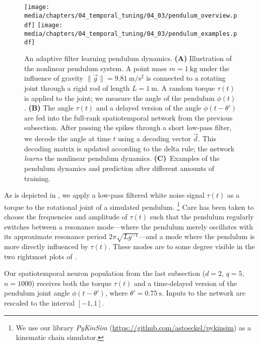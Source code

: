 \begin{figure}
	\centering
	\texttt{[image: media/chapters/04\_temporal\_tuning/04\_03/pendulum\_overview.pdf]}
	\texttt{[image: media/chapters/04\_temporal\_tuning/04\_03/pendulum\_examples.pdf]}%
	{\label{fig:pendulum_overview_a}}%
	{\label{fig:pendulum_overview_b}}%
	{\label{fig:pendulum_overview_c}}%
	\caption[An adaptive filter learning pendulum dynamics]{
		An adaptive filter learning pendulum dynamics.
		\textbf{(A)} Illustration of the nonlinear pendulum system.
		A point mass $m = \SI{1}{\kilogram}$ under the influence of gravity $\| \vec g \| = \SI{9.81}{\metre\per\square\second}$ is connected to a rotating joint through a rigid rod of length $L = \SI{1}{\metre}$.
		A random torque $\tau(t)$ is applied to the joint; we measure the angle of the pendulum $\phi(t)$.
		\textbf{(B)} The angle $\tau(t)$ and a delayed version of the angle $\phi(t - \theta')$ are fed into the full-rank spatiotemporal \NEF network from the previous subsection.
		After passing the spikes through a short low-pass filter, we decode the angle at time $t$ using a decoding vector $\vec d$.
		This decoding matrix is updated according to the delta rule; the network \emph{learns} the nonlinear pendulum dynamics.
		\textbf{(C)}~Examples of the pendulum dynamics and prediction after different amounts of training.
	}
	\label{fig:pendulum_overview}
\end{figure}
As is depicted in , we apply a low-pass filtered white noise signal $\tau(t)$ as a torque to the rotational joint of a simulated pendulum.%
\footnote{We use our library \emph{PyKinSim} (\url{https://github.com/astoeckel/pykinsim}) as a kinematic chain simulator.}
Care has been taken to choose the frequencies and amplitude of $\tau(t)$ such that the pendulum regularly switches between a resonance mode---where the pendulum merely oscillates with its approximate resonance period $2 \pi \sqrt{L g^{-1}}$---and a mode where the pendulum is more directly influenced by $\tau(t)$.
These modes are to some degree visible in the two rightmost plots of .

Our spatiotemporal neuron population from the last subsection ($d = 2$, $q = 5$, $n = 1000$) receives both the torque $\tau(t)$ and a time-delayed version of the pendulum joint angle $\phi(t - \theta')$, where $\theta' = \SI{0.75}{\second}$.
Inputs to the network are rescaled to the interval $[-1, 1]$.

\pagebreak

